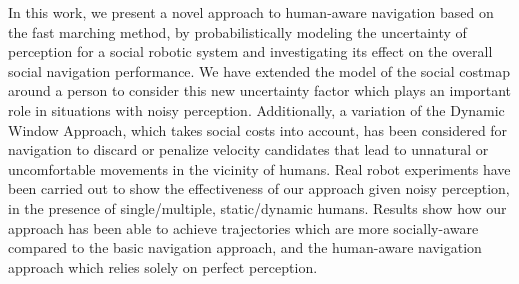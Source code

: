 In this work, we present a novel approach to human-aware navigation based on the fast marching method, by probabilistically modeling the uncertainty of perception for a social robotic system and investigating its effect on the overall social navigation performance. We have extended the model of the social costmap around a person to consider this new uncertainty factor which plays an important role in situations with noisy perception. Additionally, a variation of the Dynamic Window Approach, which takes social costs into account, has been considered for navigation to discard or penalize velocity candidates that lead to unnatural or uncomfortable movements in the vicinity of humans. 
Real robot experiments have been carried out to show the effectiveness of our approach given noisy perception, in the presence of single/multiple, static/dynamic humans. Results show how our approach has been able to achieve trajectories which are more socially-aware compared to the basic navigation approach, and the human-aware navigation approach which relies solely on perfect perception.
